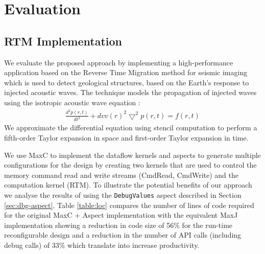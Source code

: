 \section{Evaluation}

\subsection{RTM Implementation}
We evaluate the proposed approach by implementing a high-performance
application based on the Reverse Time Migration method for seismic
imaging which is used to detect geological structures, based on the
Earth's response to injected acoustic waves. The technique models the
propagation of injected waves using the isotropic acoustic wave
equation \cite{araya2011assessing}:
\begin{align}
\frac{d^2p(r,t)}{dt^2} + {dvv(r)}^2\bigtriangledown^2p(r,t) = f(r,t)
\end{align}
We approximate the differential equation using stencil computation to
perform a fifth-order Taylor expansion in space and first-order Taylor
expansion in time.

We use MaxC to implement the dataflow kernels and aspects to generate
multiple configurations for the design by creating two kernels that
are used to control the memory command read and write streams
(CmdRead, CmdWrite) and the computation kernel (RTM).  To illustrate
the potential benefits of our approach we analyse the results of using
the \texttt{DebugValues} aspect described in Section
\ref{sec:dbg-aspect}.  Table \ref{table:loc} compares the number of
lines of code required for the original MaxC + Aspect implementation
with the equivalent MaxJ implementation showing a reduction in code
size of 56\% for the run-time reconfigurable design and a reduction in
the number of API calls (including debug calls) of 33\% which
translate into increase productivity.

